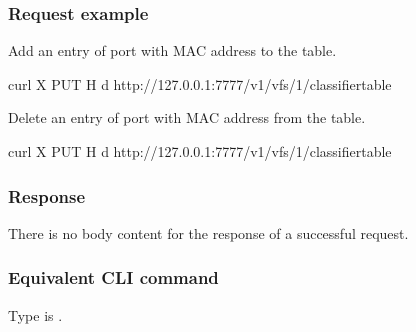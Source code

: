 \documentclass[a4paper,11pt,openany,oneside,english]{sphinxmanual}
\begin{document}
\subsubsection{Request example}
\label{\detokenize{api_ref/spp_vf:id16}}
Add an entry of port  with MAC address  to
the table.

\begin{sphinxVerbatim}[commandchars=\\\{\},formatcom=\footnotesize]
 curl \PYGZhy{}X PUT \PYGZhy{}H  
  \PYGZhy{}d 
 
  http://127.0.0.1:7777/v1/vfs/1/classifier\PYGZus{}table
\end{sphinxVerbatim}

Delete an entry of port  with MAC address  from
the table.

\begin{sphinxVerbatim}[commandchars=\\\{\},formatcom=\footnotesize]
 curl \PYGZhy{}X PUT \PYGZhy{}H  
  \PYGZhy{}d 
 
  http://127.0.0.1:7777/v1/vfs/1/classifier\PYGZus{}table
\end{sphinxVerbatim}


\subsubsection{Response}
\label{\detokenize{api_ref/spp_vf:id17}}
There is no body content for the response of a successful  request.


\subsubsection{Equivalent CLI command}
\label{\detokenize{api_ref/spp_vf:id18}}
Type is .
\end{document}
